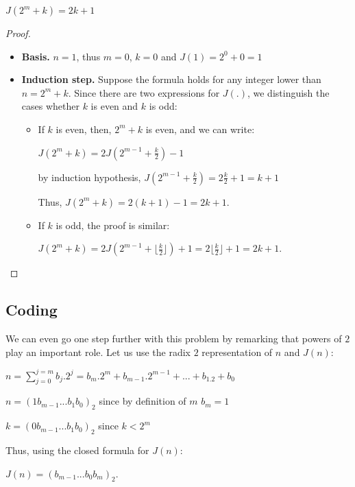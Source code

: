 {\begin{prop}
$J(2^m+k) = 2k+1$ 
\end{prop}

\begin{proof}
\begin{itemize}
\item {\bf Basis.} 
$n=1$, thus $m=0$, $k=0$ and $J(1) = 2^0+0 = 1$
\item {\bf Induction step.} 
Suppose the formula holds for any integer lower than $n=2^m+k$. 
Since there are two expressions for $J(.)$, we distinguish the cases whether $k$ is even and $k$ is odd:
\begin{itemize}
\item If $k$ is even, then, $2^m+k$ is even, and we can write:

$J(2^m+k) = 2J(2^{m-1}+\frac{k}{2})-1$

by induction hypothesis, $J(2^{m-1} +\frac{k}{2}) = 2\frac{k}{2} +1 = k+1$

Thus, $J(2^m+k) = 2(k+1) -1 = 2k+1$.

\item If $k$ is odd, the proof is similar:

$J(2^m+k) = 2J(2^{m-1}+\lfloor \frac{k}{2} \rfloor)+1 = 2\lfloor \frac{k}{2} \rfloor +1 = 2k+1$.

\end{itemize}
\end{itemize}
\end{proof}

\subsection{Coding}

We can even go one step further with this problem by remarking that powers of $2$ play an important role.
Let us use the radix $2$ representation of $n$ and $J(n)$:

$n = \sum_{j=0}^{j=m} b_j.2^j = b_m.2^m + b_{m-1}.2^{m-1} + ... + b_1.2 + b_0$

$n = (1 b_{m-1} ... b_1 b_0)_2$ since by definition of $m$ $b_m=1$ 

$k = (0 b_{m-1} ... b_1 b_0)_2$ since $k < 2^m$

Thus, using the closed formula for $J(n)$:

$J(n) = (b_{m-1} ... b_0 b_m)_2$.

}
